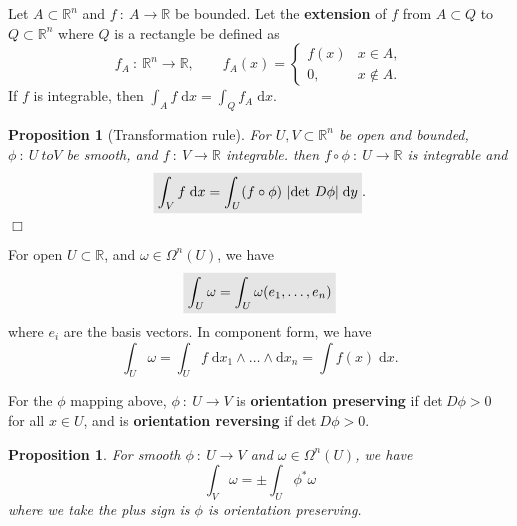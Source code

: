 \documentclass[letter-paper]{tufte-book}
\newtheorem{proposition}[theorem]{\color{pastel-blue}Proposition}
\newcommand{\qedwhite}{\hfill \ensuremath{\Box}}
\newcommand{\highlight}[1]{\mathchoice%
  {\colorbox{black!10}{$\displaystyle#1$}}%
  {\colorbox{black!10}{$\textstyle#1$}}%
  {\colorbox{black!10}{$\scriptstyle#1$}}%
  {\colorbox{black!10}{$\scriptscriptstyle#1$}}}%
\begin{document}
Let $A \subset \mathbb{R}^n$ and $f\ :\ A \to \mathbb{R}$ be bounded. Let the \textbf{extension} of $f$ from $A \subset Q$ to $Q \subset \mathbb{R}^n$ where $Q$ is a rectangle be defined as
\begin{equation*}
  f_A\ :\ \mathbb{R}^n \to \mathbb{R}, \qquad f_A(x) = \begin{cases}f(x) & x \in A, \\ 0, & x \not\in A. \end{cases}
\end{equation*}
If $f$ is integrable, then $\int_A f\; \mathrm{d}x = \int_Q f_A\; \mathrm{d}x$.

\begin{proposition}[Transformation rule]\label{thm:transform}
  For $U, V\subset \mathbb{R}^n$ be open and bounded, $\phi\ :\ U\ to V$ be smooth, and $f\ :\ V \to \mathbb{R}$ integrable. then $f\circ\phi\ :\ U\to\mathbb{R}$ is integrable and
  \begin{equation}
    \highlight{\int_V f\; \mathrm{d}x = \int_U (f\circ\phi)\ |\mbox{det}\ D\phi|\; \mathrm{d}y}.
  \end{equation}
  \qedwhite
\end{proposition}

For open $U \subset \mathbb{R}$, and $\omega \in \Omega^n(U)$, we have
\begin{equation}
  \highlight{\int_U \omega = \int_U \omega(e_1, \ldots, e_n)}
\end{equation}
where $e_i$ are the basis vectors. In component form, we have
\begin{equation}
  \int_U \omega = \int_U f\; \mathrm{d}x_1 \wedge \ldots \wedge \mathrm{d}x_n = \int f(x)\; \mathrm{d}x.
\end{equation}

For the $\phi$ mapping above, $\phi\ :\ U \to V$ is \textbf{orientation preserving} if $\mbox{det}\ D\phi > 0$ for all $x \in U$, and is \textbf{orientation reversing} if $\mbox{det}\ D\phi > 0$.

\begin{proposition}
  For smooth $\phi\ :\ U \to V$ and $\omega \in \Omega^n(U)$, we have
  \begin{equation*}
    \int_V \omega = \pm \int_U \phi^*\omega
  \end{equation*}
  where we take the plus sign is $\phi$ is orientation preserving.
\end{proposition}
\end{document}
